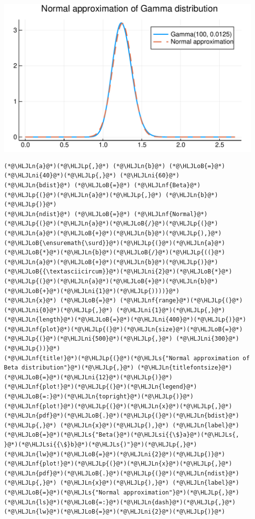 \documentclass[12pt,a4paper,xelatex,ja=standard]{bxjsarticle}
\newcommand{\HLJLn}[1]{#1}
\newcommand{\HLJLnf}[1]{\textcolor[RGB]{66,102,213}{#1}}
\newcommand{\HLJLs}[1]{\textcolor[RGB]{201,61,57}{#1}}
\newcommand{\HLJLsi}[1]{#1}
\newcommand{\HLJLni}[1]{\textcolor[RGB]{59,151,46}{#1}}
\newcommand{\HLJLoB}[1]{\textcolor[RGB]{102,102,102}{\textbf{#1}}}
\newcommand{\HLJLp}[1]{#1}
\begin{document}
\begin{center}
\includegraphics[width=0.8\linewidth]{figures/テスト_3_1.pdf}
\end{center}

\begin{lstlisting}
(*@\HLJLn{a}@*)(*@\HLJLp{,}@*) (*@\HLJLn{b}@*) (*@\HLJLoB{=}@*) (*@\HLJLni{40}@*)(*@\HLJLp{,}@*) (*@\HLJLni{60}@*)
(*@\HLJLn{bdist}@*) (*@\HLJLoB{=}@*) (*@\HLJLnf{Beta}@*)(*@\HLJLp{(}@*)(*@\HLJLn{a}@*)(*@\HLJLp{,}@*) (*@\HLJLn{b}@*)(*@\HLJLp{)}@*)
(*@\HLJLn{ndist}@*) (*@\HLJLoB{=}@*) (*@\HLJLnf{Normal}@*)(*@\HLJLp{(}@*)(*@\HLJLn{a}@*)(*@\HLJLoB{/}@*)(*@\HLJLp{(}@*)(*@\HLJLn{a}@*)(*@\HLJLoB{+}@*)(*@\HLJLn{b}@*)(*@\HLJLp{),}@*) (*@\HLJLoB{\ensuremath{\surd}}@*)(*@\HLJLp{(}@*)(*@\HLJLn{a}@*)(*@\HLJLoB{*}@*)(*@\HLJLn{b}@*)(*@\HLJLoB{/}@*)(*@\HLJLp{((}@*)(*@\HLJLn{a}@*)(*@\HLJLoB{+}@*)(*@\HLJLn{b}@*)(*@\HLJLp{)}@*)(*@\HLJLoB{{\textasciicircum}}@*)(*@\HLJLni{2}@*)(*@\HLJLoB{*}@*)(*@\HLJLp{(}@*)(*@\HLJLn{a}@*)(*@\HLJLoB{+}@*)(*@\HLJLn{b}@*)(*@\HLJLoB{+}@*)(*@\HLJLni{1}@*)(*@\HLJLp{))))}@*)
(*@\HLJLn{x}@*) (*@\HLJLoB{=}@*) (*@\HLJLnf{range}@*)(*@\HLJLp{(}@*)(*@\HLJLni{0}@*)(*@\HLJLp{,}@*) (*@\HLJLni{1}@*)(*@\HLJLp{,}@*) (*@\HLJLn{length}@*)(*@\HLJLoB{=}@*)(*@\HLJLni{400}@*)(*@\HLJLp{)}@*)
(*@\HLJLnf{plot}@*)(*@\HLJLp{(}@*)(*@\HLJLn{size}@*)(*@\HLJLoB{=}@*)(*@\HLJLp{(}@*)(*@\HLJLni{500}@*)(*@\HLJLp{,}@*) (*@\HLJLni{300}@*)(*@\HLJLp{))}@*)
(*@\HLJLnf{title!}@*)(*@\HLJLp{(}@*)(*@\HLJLs{"Normal approximation of Beta distribution"}@*)(*@\HLJLp{,}@*) (*@\HLJLn{titlefontsize}@*)(*@\HLJLoB{=}@*)(*@\HLJLni{12}@*)(*@\HLJLp{)}@*)
(*@\HLJLnf{plot!}@*)(*@\HLJLp{(}@*)(*@\HLJLn{legend}@*)(*@\HLJLoB{=:}@*)(*@\HLJLn{topright}@*)(*@\HLJLp{)}@*)
(*@\HLJLnf{plot!}@*)(*@\HLJLp{(}@*)(*@\HLJLn{x}@*)(*@\HLJLp{,}@*) (*@\HLJLn{pdf}@*)(*@\HLJLoB{.}@*)(*@\HLJLp{(}@*)(*@\HLJLn{bdist}@*)(*@\HLJLp{,}@*) (*@\HLJLn{x}@*)(*@\HLJLp{),}@*) (*@\HLJLn{label}@*)(*@\HLJLoB{=}@*)(*@\HLJLs{"Beta(}@*)(*@\HLJLsi{{\$}a}@*)(*@\HLJLs{, }@*)(*@\HLJLsi{{\$}b}@*)(*@\HLJLs{)"}@*)(*@\HLJLp{,}@*) (*@\HLJLn{lw}@*)(*@\HLJLoB{=}@*)(*@\HLJLni{2}@*)(*@\HLJLp{)}@*)
(*@\HLJLnf{plot!}@*)(*@\HLJLp{(}@*)(*@\HLJLn{x}@*)(*@\HLJLp{,}@*) (*@\HLJLn{pdf}@*)(*@\HLJLoB{.}@*)(*@\HLJLp{(}@*)(*@\HLJLn{ndist}@*)(*@\HLJLp{,}@*) (*@\HLJLn{x}@*)(*@\HLJLp{),}@*) (*@\HLJLn{label}@*)(*@\HLJLoB{=}@*)(*@\HLJLs{"Normal approximation"}@*)(*@\HLJLp{,}@*) (*@\HLJLn{ls}@*)(*@\HLJLoB{=:}@*)(*@\HLJLn{dash}@*)(*@\HLJLp{,}@*) (*@\HLJLn{lw}@*)(*@\HLJLoB{=}@*)(*@\HLJLni{2}@*)(*@\HLJLp{)}@*)
\end{lstlisting}
\end{document}

